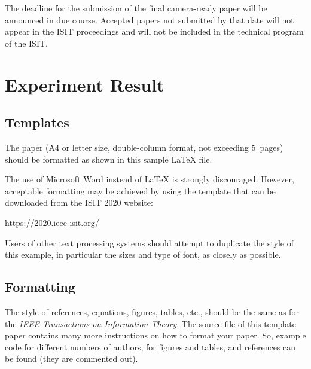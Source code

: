 \documentclass[conference,letterpaper]{IEEEtran}
\begin{document}
The deadline for the submission of the final camera-ready paper will
be announced in due course.  Accepted papers not submitted by that
date will not appear in the ISIT proceedings and will not be included
in the technical program of the ISIT.


\section{Experiment Result}\label{sec:er}

\subsection{Templates}

The paper (A4 or letter size, double-column format, not exceeding
5~pages) should be formatted as shown in this sample \LaTeX{} file.

The use of Microsoft Word instead of \LaTeX{} is strongly
discouraged. However, acceptable formatting may be achieved by using
the template that can be downloaded from the ISIT 2020 website:
\begin{center}
  \url{https://2020.ieee-isit.org/}
\end{center}

Users of other text processing systems should attempt to duplicate the
style of this example, in particular the sizes and type of font, as
closely as possible.


\subsection{Formatting}

The style of references, equations, figures, tables, etc., should be
the same as for the \emph{IEEE Transactions on Information
  Theory}. The source file of this template paper contains many more
instructions on how to format your paper. So, example code for
different numbers of authors, for figures and tables, and references
can be found (they are commented out).

\end{document}

